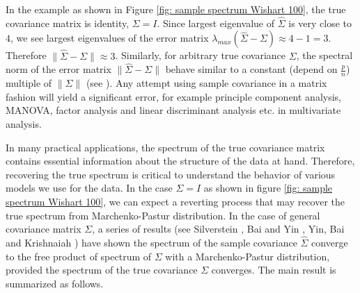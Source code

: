 \documentclass[12pt]{extarticle}
\newcommand{\1}{\field{1}}
\numberwithin{equation}{section}
\begin{document}
In the example as shown in Figure \ref{fig: sample spectrum Wishart 100}, the true covariance matrix is identity, $\Sigma = I$. Since largest eigenvalue of $\hat{\Sigma}$ is very close to $4$, we see largest eigenvalues of the error matrix $\lambda_{max}(\hat{\Sigma} -\Sigma) \approx 4-1=3 $. Therefore $\|\hat{\Sigma} -\Sigma \|\approx 3 $. Similarly, for arbitrary true covariance $\Sigma$, the spectral norm of the error  matrix $\|\hat{\Sigma} -\Sigma \|$ behave similar to a constant (depend on $\frac{p}{n}$) multiple of $\|\Sigma\|$ (see \cite{Kolt2}). Any attempt using sample covariance in a matrix fashion will yield a significant error, for example principle component analysis, MANOVA, factor analysis and linear discriminant analysis etc. in multivariate analysis. 

In many practical applications, the spectrum of the true covariance matrix contains essential information about the structure of the data at hand. Therefore, recovering the true spectrum is critical to understand the behavior of various models we use for the data. In the case  $\Sigma =I$ as shown in figure \ref{fig: sample spectrum Wishart 100}, we can expect a reverting process that may recover the true spectrum from Marchenko-Pastur distribution. In the case of general  covariance matrix $\Sigma$, a series of results (see Silverstein \cite{silverstein1995}, Bai and Yin \cite{bai1988}, Yin, Bai and Krishnaiah \cite{yin1983} ) have shown the spectrum of the sample covariance $\hat{\Sigma}$ converge to the free product of spectrum of $\Sigma$ with a Marchenko-Pastur distribution, provided the spectrum of the true covariance $\Sigma$ converges. The main result is summarized as follows.
\end{document}
